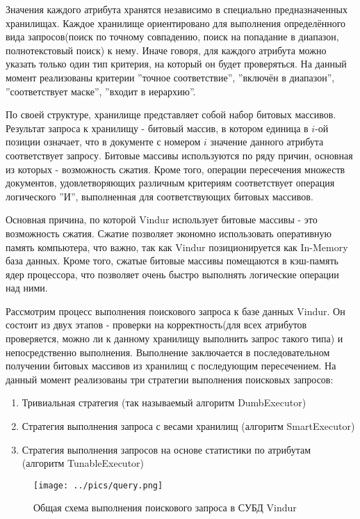 \documentclass{matmex-diploma}
\begin{document}
    Значения каждого атрибута хранятся независимо в специально предназначенных хранилищах. Каждое хранилище ориентировано для выполнения определённого вида запросов(поиск по точному совпадению, поиск на попадание в диапазон, полнотекстовый поиск) к нему. Иначе говоря, для каждого атрибута можно указать только один тип критерия, на который он будет проверяться. На данный момент реализованы критерии ''точное соответствие'', ''включён в диапазон'', ''соответствует маске'', ''входит в иерархию''. 
    
    По своей структуре, хранилище представляет собой набор битовых массивов. Результат запроса к хранилищу - битовый массив, в котором единица в $i$-ой позиции означает, что в документе с номером $i$ значение данного атрибута соответствует запросу. Битовые массивы используются по ряду причин, основная из которых - возможность сжатия. Кроме того, операции пересечения множеств документов, удовлетворяющих различным критериям соответствует операция логического ''И'', выполненная для соответствующих битовых массивов.
    
    Основная причина, по которой Vindur использует битовые массивы - это возможность сжатия. Сжатие позволяет экономно использовать оперативную память компьютера, что важно, так как Vindur позиционируется как In-Memory база данных. Кроме того, сжатые битовые массивы помещаются в кэш-память ядер процессора, что позволяет очень быстро выполнять логические операции над ними. 
    
    Рассмотрим процесс выполнения поискового запроса к базе данных Vindur. Он состоит из двух этапов - проверки на корректность(для всех атрибутов проверяется, можно ли к данному хранилищу выполнить запрос такого типа) и непосредственно выполнения. Выполнение заключается в последовательном получении битовых массивов из хранилищ с последующим пересечением. На данный момент реализованы три стратегии выполнения поисковых запросов:
    \begin{enumerate}
        \item Тривиальная стратегия (так называемый алгоритм DumbExecutor)
        \item Стратегия выполнения запроса с весами хранилищ (алгоритм SmartExecutor)
        \item Стратегия выполнения запросов на основе статистики по атрибутам (алгоритм TunableExecutor)
    \end{enumerate}
    
    \begin{figure}[H]
        \label{query}
        \centering
        \texttt{[image: ../pics/query.png]}
        \caption{Общая схема выполнения поискового запроса в СУБД Vindur}
    \end{figure}
\end{document}

